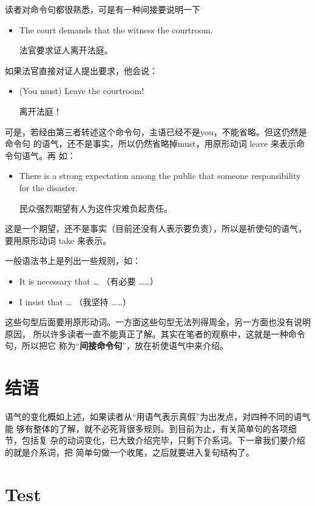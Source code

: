 \documentclass{yufa}
\newcommand\unbf[1]{\CJKunderline[thickness=0.8pt, textformat=\bfseries]{#1}}
\begin{document}
读者对命令句都很熟悉，可是有一种间接要说明一下
\begin{itemize}
\item The court demands that the witness \unbf{leave} the courtroom.

  法官要求证人离开法庭。
\end{itemize}

如果法官直接对证人提出要求，他会说：
\begin{itemize}
\item  (You must) Leave the courtroom!

  离开法庭！
\end{itemize}
可是，若经由第三者转述这个命令句，主语已经不是you，不能省略。但这仍然是命令句
的语气，还不是事实，所以仍然省略掉must，用原形动词 leave 来表示命令句语气。再
如：
\begin{itemize}
\item There is a strong expectation among the public that someone \unbf{take}
  responsibility for the disaster.

  民众强烈期望有人为这件灾难负起责任。
\end{itemize}
这是一个期望，还不是事实（目前还没有人表示要负责），所以是祈使句的语气，要用原形动词
take 来表示。

一般语法书上是列出一些规则，如：
\begin{itemize}
\item  It is necessary that \ldots{} （有必要 \ldots \ldots）
\item  I insist that \ldots{} （我坚持 \ldots \ldots）
\end{itemize}

这些句型后面要用原形动词。一方面这些句型无法列得周全，另一方面也没有说明原因，
所以许多读者一直不能真正了解。其实在笔者的观察中，这就是一种命令句，所以把它
称为“\textbf{间接命令句}”，放在祈使语气中来介绍。

\section{结语}

语气的变化概如上述，如果读者从“用语气表示真假”为出发点，对四种不同的语气能
够有整体的了解，就不必死背很多规则。到目前为止，有关简单句的各项细节，包括复
杂的动词变化，已大致介绍完毕，只剩下介系词。下一章我们要介绍的就是介系词，把
简单句做一个收尾，之后就要进入复句结构了。

\section{Test}
\end{document}
